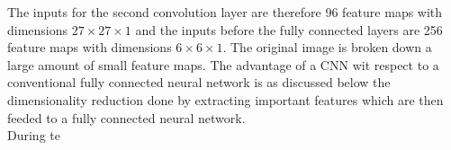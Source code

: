 \documentclass[a4paper,10pt]{article}
\begin{document}
The inputs for the second convolution layer are therefore 96 feature maps with dimensions $ 27 \times 27 \times 1$ and the inputs before the fully connected layers are 256 feature maps with dimensions $ 6 \times 6 \times 1$. The original image is broken down a large amount of small feature maps. The advantage of a CNN wit respect to a conventional fully connected neural network is as discussed below the dimensionality reduction done by extracting important features which are then feeded to a fully connected neural network.\\
During te












%
\end{document}
